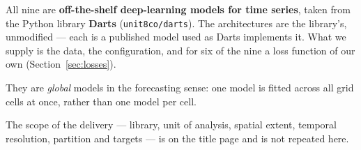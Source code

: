 All nine are \textbf{off-the-shelf deep-learning models for time series}, taken from the Python
library \textbf{Darts} (\texttt{unit8co/darts}). The architectures are the library's, unmodified ---
each is a published model used as Darts implements it. What we supply is the data, the
configuration, and for six of the nine a loss function of our own (Section~\ref{sec:losses}).

They are \textit{global} models in the forecasting sense: one model is fitted across all grid cells
at once, rather than one model per cell.

The scope of the delivery --- library, unit of analysis, spatial extent, temporal resolution,
partition and targets --- is on the title page and is not repeated here.
